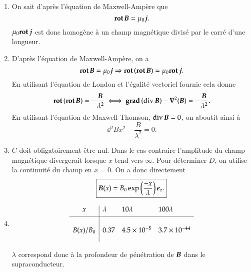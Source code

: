 \begin{corrige}
\begin{enumerate}
	\item On sait d'après l'équation de Maxwell-Ampère que 
	\begin{equation*}
		\rot \vecb = \mu_0 \vecj.
	\end{equation*}
	$\mu_0 \rot \vecj$ est donc homogène à un champ magnétique divisé par le carré
	d'une longueur. 

	\item D'après l'équation de Maxwell-Ampère, on a
	\begin{equation*}
		\rot \vecb = \mu_0 \vecj \Rightarrow \rot(\rot \vecb) = \mu_0 \rot \vecj.
	\end{equation*}
	En utilisant l'équation de London et l'égalité vectoriel fournie cela donne
	\begin{equation*}
		\rot(\rot \vecb) = -\dfrac{\vecb}{\lambda^2} \iff
		\gradient(\div \vecb) - \laplacien(\vecb) = -\dfrac{\vecb}{\lambda^2}.
	\end{equation*}
	En utilisant l'équation de Maxwell-Thomson, $\div \vecb = 0$, on aboutit ainsi à
	\begin{equation*}
		\boxed{\dd{^2B}{x^2} - \dfrac{B}{\lambda^2} = 0.}
	\end{equation*}

	\item $C$ doit obligatoirement être nul. Dans le cas contraire l'amplitude du
	      champ magnétique divergerait lorsque $x$ tend vers $\infty$. Pour déterminer $D$,
	      on utilise la continuité du champ en $x = 0$. On a donc directement
	      \begin{equation*}
		      \boxed{\vecb(x) = B_0 \exp\left(\dfrac{-x}{\lambda}\right)\ez.}
	      \end{equation*}
	
	\item
	\begin{equation*}
	     \begin{array}{c|lll}
			x	& \lambda & 10\lambda & 100\lambda \\[0.3em] \hline \\[0.2em]
			B(x)/B_0 & 0.37    & 4.5 \times 10^{-5} & 3.7 \times 10^{-44} \\[1em]
	      \end{array}
	\end{equation*}

	     $\lambda$ correspond donc à la profondeur de pénétration de $\vecb$
	     dans le supraconducteur.
\end{enumerate}
\end{corrige}

